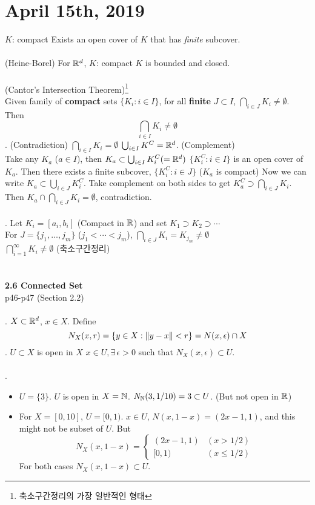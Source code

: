 \section*{April 15th, 2019}
$K$: compact \miff Exists an open cover of $ K $ that has \textit{finite} subcover.\\
\\
 (Heine-Borel) For $\mathbb{R}^d$, $K$: compact \miff $K$ is bounded and closed.\\
\\
 (Cantor's Intersection Theorem)\footnote{축소구간정리의 가장 일반적인 형태}\\
Given family of \textbf{compact} sets $\{K_i:i\in I\}$, for all \textbf{finite} $ J \subset I$, $\bigcap_{i\in J} K_i\neq \emptyset$. Then $$\bigcap_{i\in I} K_i\neq \emptyset$$
\pf. (Contradiction) $\bigcap_{i\in I} K_i = \emptyset$ \mimp $\bigcup_{i\in I} K^C = \mathbb{R}^d$. (Complement)\\
Take any $K_a$ ($a\in I$), then $K_a \subset \bigcup_{i\in I} K_i^C(=\mathbb{R}^d)$ \mimp $\{ K_i^C: i\in I\}$ is an open cover of $K_a$. Then there exists a finite subcover, $\{K_i^C: i\in J \}$ ($K_a$ is compact) Now we can write $K_a\subset \bigcup_{i\in J} K_i^C$. Take complement on both sides to get $K_a^C\supset \bigcap_{i\in J}K_i$. Then $K_a\cap \bigcap_{i\in J} K_i = \emptyset$, contradiction.\\
\\
\rmk. Let $K_i = [a_i, b_i]$ (Compact in $\mathbb{R}$) and set $K_1\supset K_2\supset \cdots$\\
\mimp For $J = \{j_1, \dots, j_m\}$ ($j_1 < \cdots < j_m$), $\bigcap_{i\in J} K_i = K_{j_m} \neq \emptyset$\\
\mimp $\bigcap_{i=1}^\infty K_i \neq \emptyset$ (축소구간정리)\\
\\
\\
\textbf{2.6 Connected Set}\\
p46-p47 (Section 2.2)\\
\\
. $ X\subset \mathbb{R}^d $, $x\in X$. Define $$N_X(x, r) = \{y\in X: \left\lVert y - x\right\rVert < r \} = N(x, \epsilon) \cap X$$
. $U\subset X$ is open in $X$ \miff $x\in U, \exists\, \epsilon > 0$ such that $N_X(x, \epsilon) \subset U$.\\
\\
\ex.
\begin{itemize}
	\item $U = \{3\}$. $U$ is open in $X = \mathbb{N}$. $N_{\mathbb{N}}(3, 1/10) = {3} \subset U$. (But not open in $\mathbb{R}$)
	\item For $X = [0, 10]$, $ U = [0, 1)$.
	$x\in U$, $N(x, 1-x) = (2x - 1, 1)$, and this might not be subset of $U$. But $$N_X(x, 1-x) = \begin{cases}
		(2x-1, 1) & (x > 1/2)\\
		[0, 1) & (x\leq 1/2)
	\end{cases}$$
	For both cases $N_X(x, 1-x) \subset U$.
\end{itemize}
